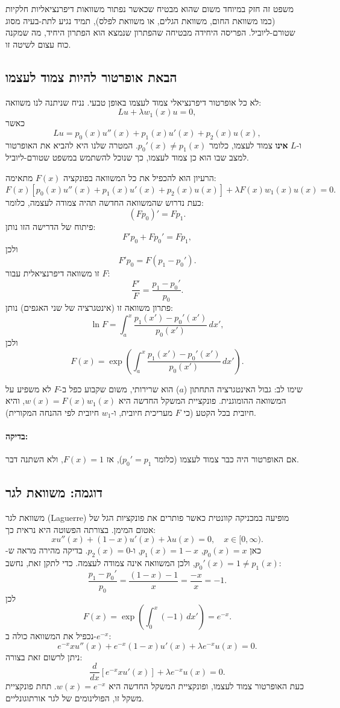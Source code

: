 משפט זה חזק במיוחד משום שהוא מבטיח שכאשר נפתור משוואות דיפרנציאליות חלקיות (כמו משוואת החום, משוואת הגלים, או משוואת לפלס), תמיד נגיע לתת-בעיה מסוג שטורם-ליוביל. הפריסה היחידה מבטיחה שהפתרון שנמצא הוא הפתרון היחיד, מה שמקנה כוח עצום לשיטה זו.

\subsection*{הבאת אופרטור להיות צמוד לעצמו}

לא כל אופרטור דיפרנציאלי צמוד לעצמו באופן טבעי. נניח שניתנה לנו משוואה:
\[
L u + \lambda w_1(x) u = 0,
\]
כאשר
\[
L u = p_0(x) u''(x) + p_1(x) u'(x) + p_2(x) u(x),
\]
ו-\(L\) \textbf{אינו} צמוד לעצמו, כלומר \(p_0'(x) \neq p_1(x)\). המטרה שלנו היא להביא את האופרטור למצב שבו הוא כן צמוד לעצמו, כך שנוכל להשתמש במשפט שטורם-ליוביל.

הרעיון הוא להכפיל את כל המשוואה בפונקציה \(F(x)\) מתאימה:
\[
F(x) \left[ p_0(x) u''(x) + p_1(x) u'(x) + p_2(x) u(x) \right] + \lambda F(x) w_1(x) u(x) = 0.
\]
כעת נדרוש שהמשוואה החדשה תהיה צמודה לעצמה, כלומר:
\[
(F p_0)' = F p_1.
\]
פיתוח של הדרישה הזו נותן:
\[
F' p_0 + F p_0' = F p_1,
\]
ולכן
\[
F' p_0 = F(p_1 - p_0').
\]
זו משוואה דיפרנציאלית עבור \(F\):
\[
\frac{F'}{F} = \frac{p_1 - p_0'}{p_0}.
\]
פתרון משוואה זו (אינטגרציה של שני האגפים) נותן:
\[
\ln F = \int_a^x \frac{p_1(x') - p_0'(x')}{p_0(x')} \, dx',
\]
ולכן
\[
F(x) = \exp\left( \int_a^x \frac{p_1(x') - p_0'(x')}{p_0(x')} \, dx' \right).
\]

שימו לב: גבול האינטגרציה התחתון (\(a\)) הוא שרירותי, משום שקבוע כפל ב-\(F\) לא משפיע על המשוואה ההומוגנית. פונקציית המשקל החדשה היא \(w(x) = F(x) w_1(x)\), והיא חיובית בכל הקטע (כי \(F\) מעריכית חיובית, ו-\(w_1\) חיובית לפי ההנחה המקורית).

\paragraph{בדיקה:} אם האופרטור היה כבר צמוד לעצמו (כלומר \(p_0' = p_1\)), אז \(F(x) = 1\), ולא השתנה דבר.

\subsection*{דוגמה: משוואת לגר}

משוואת לגר (Laguerre) מופיעה במכניקה קוונטית כאשר פותרים את פונקציות הגל של אטום המימן. בצורתה הפשוטה היא נראית כך:
\[
x u''(x) + (1 - x) u'(x) + \lambda u(x) = 0, \quad x \in [0, \infty).
\]
כאן \(p_0(x) = x\), \(p_1(x) = 1 - x\), ו-\(p_2(x) = 0\). בדיקה מהירה מראה ש-\(p_0'(x) = 1 \neq p_1(x)\), ולכן המשוואה אינה צמודה לעצמה. כדי לתקן זאת, נחשב:
\[
\frac{p_1 - p_0'}{p_0} = \frac{(1-x) - 1}{x} = \frac{-x}{x} = -1.
\]
לכן
\[
F(x) = \exp\left( \int_0^x (-1) \, dx' \right) = e^{-x}.
\]
נכפיל את המשוואה כולה ב-\(e^{-x}\):
\[
e^{-x} x u''(x) + e^{-x}(1-x) u'(x) + \lambda e^{-x} u(x) = 0.
\]
ניתן לרשום זאת בצורה:
\[
\frac{d}{dx}\left[ e^{-x} x u'(x) \right] + \lambda e^{-x} u(x) = 0.
\]
כעת האופרטור צמוד לעצמו, ופונקציית המשקל החדשה היא \(w(x) = e^{-x}\). תחת פונקציית משקל זו, הפולינומים של לגר אורתוגונליים.

